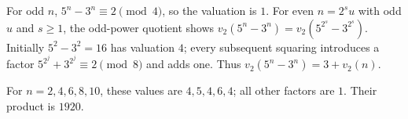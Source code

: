 For odd $n$, $5^n-3^n\equiv2\pmod4$, so the valuation is $1$. For even $n=2^su$ with odd $u$ and $s\ge1$, the odd-power quotient shows $v_2(5^n-3^n)=v_2(5^{2^s}-3^{2^s})$. Initially $5^2-3^2=16$ has valuation $4$; every subsequent squaring introduces a factor $5^{2^j}+3^{2^j}\equiv2\pmod8$ and adds one. Thus $v_2(5^n-3^n)=3+v_2(n)$.

For $n=2,4,6,8,10$, these values are $4,5,4,6,4$; all other factors are $1$. Their product is $\boxed{1920}$.

